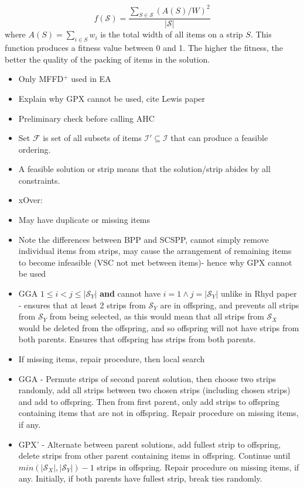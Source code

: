 \documentclass{elsarticle}
\begin{document}
\begin{equation}
	f(\mathcal{S}) = \frac{\sum_{S \in \mathcal{S}} (A(S)/W)^2}{|\mathcal{S}|}
\end{equation}
\noindent where $A(S) = \sum_{i \in S} w_i$ is the total width of all items on a strip $S$. This function produces a fitness value between 0 and 1. The higher the fitness, the better the quality of the packing of items in the solution.


\begin{itemize}
	\item Only MFFD$^+$ used in EA
	\item Explain why GPX cannot be used, cite Lewis paper
	\item Preliminary check before calling AHC
	\item Set $\mathcal{F}$ is set of all subsets of items $\mathcal{I}' \subseteq \mathcal{I}$ that can produce a feasible ordering.
	\item A feasible solution or strip means that the solution/strip abides by all constraints.
	\item xOver:
	\item May have duplicate or missing items
	\item Note the differences between BPP and SCSPP, cannot simply remove individual items from strips, may cause the arrangement of remaining items to become infeasible (VSC not met between items)- hence why GPX cannot be used \cite{lewis2017}
	\item GGA $1 \leq i < j \leq |\mathcal{S}_Y|$ \textbf{and} cannot have $i = 1 \land j = |\mathcal{S}_Y|$ unlike in Rhyd paper - ensures that at least 2 strips from $\mathcal{S}_Y$ are in offspring, and prevents all strips from $\mathcal{S}_Y$ from being selected, as this would mean that all strips from $\mathcal{S}_X$ would be deleted from the offspring, and so offspring will not have strips from both parents. Ensures that offspring has strips from both parents.
	\item If missing items, repair procedure, then local search
	\item GGA - Permute strips of second parent solution, then choose two strips randomly, add all strips between two chosen strips (including chosen strips) and add to offspring. Then from first parent, only add strips to offspring containing items that are not in offspring. Repair procedure on missing items, if any.
	\item GPX' - Alternate between parent solutions, add fullest strip to offspring, delete strips from other parent containing items in offspring. Continue until $min(|\mathcal{S}_X|,|\mathcal{S}_Y|)-1$ strips in offspring. Repair procedure on missing items, if any. Initially, if both parents have fullest strip, break ties randomly.

\end{itemize}
\end{document}
